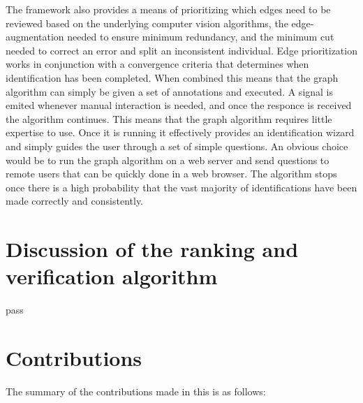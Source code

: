     The framework also provides a means of prioritizing which edges need to be reviewed based on the underlying
      computer vision algorithms, the edge-augmentation needed to ensure minimum redundancy, and the minimum cut
      needed to correct an error and split an inconsistent individual.
    Edge prioritization works in conjunction with a convergence criteria that determines when identification has
      been completed.
    When combined this means that the graph algorithm can simply be given a set of annotations and executed.
    A signal is emited whenever manual interaction is needed, and once the responce is received the algorithm
      continues.
    This means that the graph algorithm requires little expertise to use.
    Once it is running it effectively provides an identification wizard and simply guides the user through a set
      of simple questions.
    An obvious choice would be to run the graph algorithm on a web server and send questions to remote users that
      can be quickly done in a web browser.
    The algorithm stops once there is a high probability that the vast majority of identifications have been made
      correctly and consistently.

    \section{Discussion of the ranking and verification algorithm}
    pass

    \section{Contributions}\label{sec:contributions}

    The summary of the contributions made in this \thesis{} is as follows:

